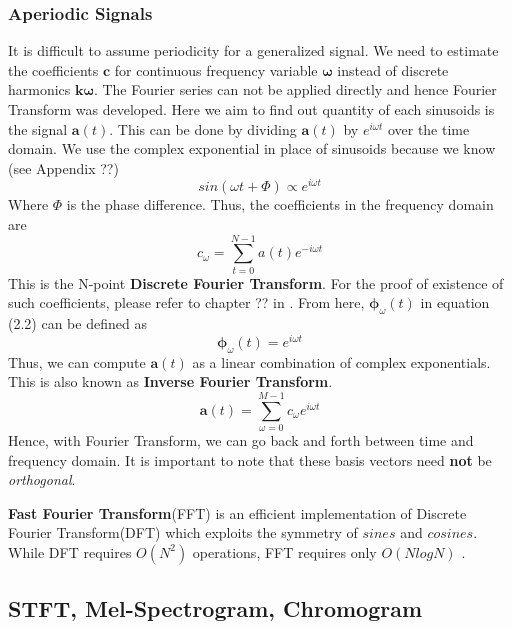 \subsubsection{Aperiodic Signals}
It is difficult to assume periodicity for a generalized signal. We need to estimate the coefficients $\textbf{c}$ for continuous frequency variable $\bm{\omega}$ instead of discrete harmonics $\textbf{k}\bm{\omega}$. The Fourier series can not be applied directly and hence Fourier Transform was developed. Here we aim to find out quantity of each sinusoids is the signal $\textbf{a}(t)$. This can be done by dividing  $\textbf{a}(t)$ by $e^{i \omega t}$ over the time domain. We use the complex exponential in place of sinusoids because we know (see Appendix ??)
\begin{equation}
sin(\omega t + \Phi) \propto e^{i \omega t}
\end{equation} 
Where $\Phi$ is the phase difference. Thus, the coefficients in the frequency domain are 
\begin{equation}
c_{\omega} =  \displaystyle\sum_{t=0}^{N-1}a(t)e^{-i \omega t}
\end{equation}  
This is the N-point \textbf{Discrete Fourier Transform}. For the proof of existence of such coefficients, please refer to chapter ?? in \cite{allen}. From here, $\bm{\phi}_{ \omega }(t)$ in equation (2.2) can be defined as
\begin{equation}
\bm{\phi}_{ \omega }(t) = e^{i \omega t}
\end{equation}
Thus, we can compute $\textbf{a}(t)$ as a linear combination of complex exponentials. This is also known as \textbf{Inverse Fourier Transform}.
\begin{equation}
\textbf{a}(t) = \displaystyle\sum_{ \omega =0}^{M-1}c_{ \omega }e^{i \omega t} 
\end{equation}
Hence, with Fourier Transform, we can go back and forth between time and frequency domain. It is important to note that these basis vectors need \textbf{not} be \textit{orthogonal}.
\bigskip

\textbf{Fast Fourier Transform}(FFT) is an efficient implementation of Discrete Fourier Transform(DFT) which exploits the symmetry of $sines$ and $cosines$. While DFT requires $O(N^2)$ operations, FFT requires only $O(NlogN)$ \cite{allen}.  

\subsection{STFT, Mel-Spectrogram, Chromogram}

